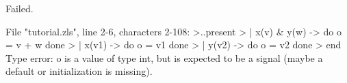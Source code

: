 \chklistingfalse
{}
\begin{ChkListingMsg}
Failed.
\end{ChkListingMsg}
\begin{ChkListingErr}
File "tutorial.zls", line 2-6, characters 2-108:
>..present
>  | x(v) & y(w) -> do o = v + w done
>  | x(v1) -> do o = v1 done
>  | y(v2) -> do o = v2 done
>  end
Type error: o is a value of type
int,
but is expected to be a signal (maybe a default or initialization is missing).
\end{ChkListingErr}

